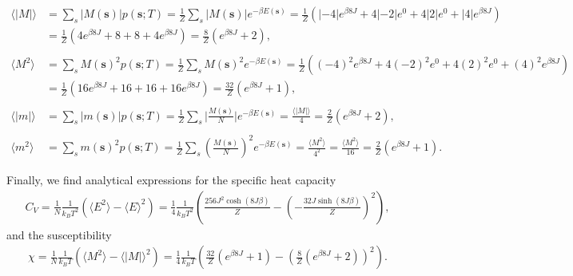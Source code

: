 \documentclass[english,notitlepage,reprint,nofootinbib]{revtex4-1}  %
\begin{document}
\begin{align*}
    \langle |M| \rangle & =  \sum_s |M(\textbf{s})|  p(\textbf{s};T)
    = \frac{1}{Z} \sum_s |M(\textbf{s})| e^{-\beta E(\textbf{s})}
    = \frac{1}{Z} \left( |-4|e^{\beta8J} + 4 |-2| e^0 + 4|2|e^0 + |4|e^{\beta 8J}\right)            \\
                        & = \frac{1}{Z} \left( 4e^{\beta8J} + 8 + 8 + 4e^{\beta 8J}\right)
    = \frac{8}{Z} \left( e^{\beta 8J} + 2 \right),
    \\
    \\
    \langle M^2 \rangle & = \sum_s M(\textbf{s})^2  p(\textbf{s};T)
    = \frac{1}{Z} \sum_s M(\textbf{s})^2 e^{-\beta E(\textbf{s})}
    = \frac{1}{Z} \left( (-4)^2 e^{\beta8J} + 4 (-2)^2 e^0 + 4(2)^2 e^0 + (4)^2 e^{\beta 8J}\right) \\
                        & = \frac{1}{Z} \left( 16 e^{\beta8J} + 16 + 16 + 16 e^{\beta 8J}\right)
    = \frac{32}{Z} \left( e^{\beta 8J} + 1 \right),
    \\
    \\
    \langle |m| \rangle & = \sum_s |m(\textbf{s})|  p(\textbf{s};T)
    = \frac{1}{Z} \sum_s \bigg| \frac{M(\textbf{s})}{N} \bigg| e^{-\beta E(\textbf{s})}
    = \frac{\langle|M| \rangle}{4}
    = \frac{2}{Z} \left( e^{\beta 8J} + 2 \right),
    \\
    \\
    \langle m^2 \rangle & = \sum_s m(\textbf{s})^2  p(\textbf{s};T)
    = \frac{1}{Z} \sum_s \left( \frac{M(\textbf{s})}{N} \right)^2 e^{-\beta E(\textbf{s})}
    = \frac{ \langle M^2 \rangle}{4^2}
    = \frac{ \langle M^2 \rangle}{16}
    = \frac{2}{Z} \left( e^{\beta 8J} + 1 \right).
\end{align*}

Finally, we find analytical expressions for the specific heat capacity
\begin{align*}
    C_V = \frac{1}{N} \frac{1}{k_B T^2} \left( \langle E^2 \rangle - \langle E \rangle^2 \right)
    = \frac{1}{4} \frac{1}{k_B T^2} \left( \frac{256 J^2 \cosh(8J \beta)}{Z} - \left( - \frac{32 J \sinh(8J \beta )}{Z} \right)^2 \right)
    ,
\end{align*}
and the susceptibility
\begin{align*}
    \chi = \frac{1}{N} \frac{1}{k_B T} \left( \langle M^2 \rangle - \langle |M| \rangle^2 \right)
    = \frac{1}{4} \frac{1}{k_B T} \left( \frac{32}{Z} \left( e^{\beta 8J} + 1 \right) - \left( \frac{8}{Z} \left( e^{\beta 8J} + 2 \right) \right)^2 \right).
\end{align*}
\end{document}
